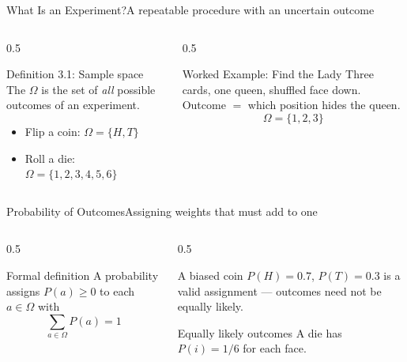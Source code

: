 \documentclass[aspectratio=169,11pt]{beamer}
\begin{document}
\begin{frame}{What Is an Experiment?}{A repeatable procedure with an uncertain outcome}
  \begin{columns}[T]
    \begin{column}{0.5\textwidth}
      \begin{block}{Definition 3.1: Sample space}
        \small The  $\Omega$ is the set of \emph{all}
        possible outcomes of an experiment.
      \end{block}
      \begin{itemize}\small
        \item Flip a coin: $\Omega=\{H,T\}$
        \item Roll a die: $\Omega=\{1,2,3,4,5,6\}$
      \end{itemize}
    \end{column}
    \begin{column}{0.5\textwidth}
      \begin{exampleblock}{Worked Example: Find the Lady}
        \small Three cards, one queen, shuffled face down. Outcome $=$ which
        position hides the queen.
        \[ \Omega = \{1, 2, 3\} \]
      \end{exampleblock}
    \end{column}
  \end{columns}
\end{frame}

\begin{frame}{Probability of Outcomes}{Assigning weights that must add to one}
  \begin{columns}[T]
    \begin{column}{0.5\textwidth}
      \begin{block}{Formal definition}
        \small A probability assigns $P(a) \ge 0$ to each $a \in \Omega$ with
        \[ \sum_{a \in \Omega} P(a) = 1 \]
      \end{block}
    \end{column}
    \begin{column}{0.5\textwidth}
      \begin{exampleblock}{A biased coin}
        \small $P(H) = 0.7$, $P(T) = 0.3$ is a valid assignment — outcomes
        need not be equally likely.
      \end{exampleblock}
      \begin{alertblock}{Equally likely outcomes}
        \small A  die has $P(i) = 1/6$ for each face.
      \end{alertblock}
    \end{column}
  \end{columns}
\end{frame}
\end{document}
